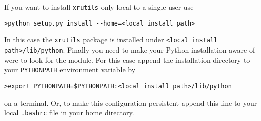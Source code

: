 If you want to install
{\tt xrutils} only local to a single user use
\begin{verbatim}
>python setup.py install --home=<local install path>
\end{verbatim}
In this case the {\tt xrutils} package is installed under {\tt <local install
path>/lib/python}. Finally you need to make your Python installation aware of
were to look for the module. For this case append the installation directory to
your {\tt PYTHONPATH} environment variable by 
\begin{verbatim}
>export PYTHONPATH=$PYTHONPATH:<local install path>/lib/python
\end{verbatim}
on a terminal. Or, to make this configuration persistent append this line to
your local {\tt .bashrc} file in your home directory.

